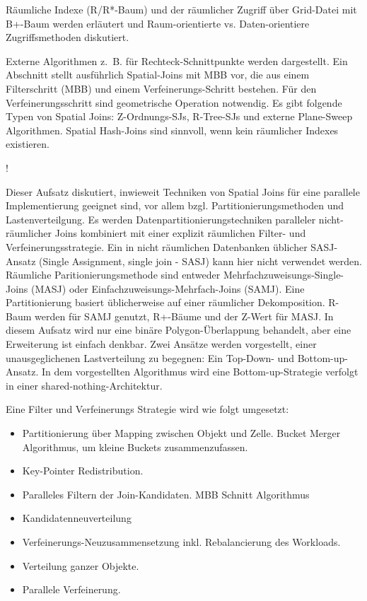 \documentclass[a4paper,12pt,twoside]{article}
\begin{document}
Räumliche Indexe (R/R*-Baum) und der räumlicher Zugriff über Grid-Datei mit B+-Baum werden erläutert und Raum-orientierte vs. Daten-orientiere Zugriffsmethoden diskutiert. 

Externe Algorithmen z.~B. für Rechteck-Schnittpunkte werden dargestellt. Ein Abschnitt stellt ausführlich Spatial-Joins mit MBB vor, die aus einem Filterschritt (MBB) und einem Verfeinerungs-Schritt bestehen. Für den Verfeinerungsschritt sind geometrische Operation notwendig. Es gibt folgende Typen von Spatial Joins: Z-Ordnungs-SJs, R-Tree-SJs und externe Plane-Sweep Algorithmen. Spatial Hash-Joins sind sinnvoll, wenn kein räumlicher Indexes existieren.

\textbf{}!

Dieser Aufsatz diskutiert, inwieweit Techniken von Spatial Joins für eine parallele Implementierung geeignet sind, vor allem bzgl. Partitionierungsmethoden und Lastenverteilgung. Es werden Datenpartitionierungstechniken paralleler nicht-räumlicher Joins kombiniert mit einer explizit räumlichen Filter- und Verfeinerungsstrategie. Ein in nicht räumlichen Datenbanken üblicher SASJ-Ansatz (Single Assignment, single join - SASJ) kann hier nicht verwendet werden. Räumliche Paritionierungsmethode sind entweder Mehrfachzuweisungs-Single-Joins (MASJ) oder Einfachzuweisungs-Mehrfach-Joins (SAMJ). Eine Partitionierung basiert üblicherweise auf einer räumlicher Dekomposition. R-Baum werden für SAMJ genutzt, R+-Bäume und der Z-Wert für MASJ. In diesem Aufsatz wird nur eine binäre Polygon-Überlappung behandelt, aber eine Erweiterung ist einfach denkbar. Zwei Ansätze werden vorgestellt, einer unausgeglichenen Lastverteilung zu begegnen: Ein Top-Down- und Bottom-up-Ansatz. In dem vorgestellten Algorithmus wird eine Bottom-up-Strategie verfolgt in einer shared-nothing-Architektur.

Eine Filter und Verfeinerungs Strategie wird wie folgt umgesetzt:

\begin{itemize}
	 \item Partitionierung über Mapping zwischen Objekt und Zelle. Bucket Merger Algorithmus, um kleine Buckets zusammenzufassen. 
	 \item Key-Pointer Redistribution.
	 \item Paralleles Filtern der Join-Kandidaten. MBB Schnitt Algorithmus
	 \item Kandidatenneuverteilung
	 \item Verfeinerungs-Neuzusammensetzung inkl. Rebalancierung des Workloads.
	 \item Verteilung ganzer Objekte. 
	 \item Parallele Verfeinerung.
 \end{itemize}
\end{document}
